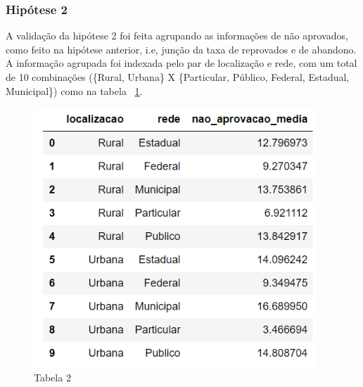 \documentclass[review]{elsarticle}
\begin{document}
\subsubsection{Hipótese 2}
A validação da hipótese 2 foi feita agrupando as informações de não aprovados, como feito na hipótese anterior, i.e, junção da taxa de reprovados e de abandono. A informação agrupada foi indexada pelo par de localização e rede, com um total de 10 combinações (\{Rural, Urbana\} X \{Particular, Público, Federal, Estadual, Municipal\}) como na tabela ~\ref{fig:t2}.\par
\begin{figure}[h!]
\includegraphics[width=300pt]{h2_table.png}
\caption{Tabela 2}
\label{fig:t2}
\centering
\end{figure}
\end{document}
